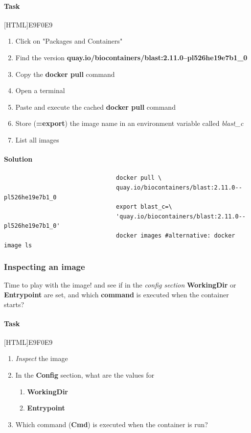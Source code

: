 \documentclass[12pt]{article}
\begin{document}
					\paragraph{Task}
						[HTML]{E9F0E9}{\parbox{\linewidth}{%
								\begin{enumerate}
									\item Click on "Packages and Containers"
									\item Find the version \textbf{quay.io/biocontainers/blast:2.11.0--pl526he19e7b1\_0}
									\item Copy the \textbf{docker pull} command
									\item Open a terminal
									\item Paste and execute the cached \textbf{docker pull} command
									\item Store (\textbf{=export}) the image name in an environment variable called \textit{blast\_c}
									\item List all images
								\end{enumerate}
						}}
					
					\paragraph{Solution}	
				
						\begin{minipage}{\linewidth}
							\begin{lstlisting}
								docker pull \
								quay.io/biocontainers/blast:2.11.0--pl526he19e7b1_0
								export blast_c=\
								'quay.io/biocontainers/blast:2.11.0--pl526he19e7b1_0'
								docker images #alternative: docker image ls
							\end{lstlisting}
						\end{minipage}
		
			\subsubsection{Inspecting an image}
				Time to play with the image!  and see if in the \textit{config section} \textbf{WorkingDir} or \textbf{Entrypoint} are set, and which \textbf{command} is executed when the container starts?
	
				\paragraph{Task}
					[HTML]{E9F0E9}{\parbox{\linewidth}{%
						\begin{enumerate}
							\item \textit{Inspect} the image
							\item In the \textbf{Config} section, what are the values for 
							 \begin{enumerate}
							 	\item \textbf{WorkingDir}
							 	\item \textbf{Entrypoint}
							\end{enumerate}
								\item Which command (\textbf{Cmd}) is executed when the container is run?
						\end{enumerate}
					}}
					
\end{document}
